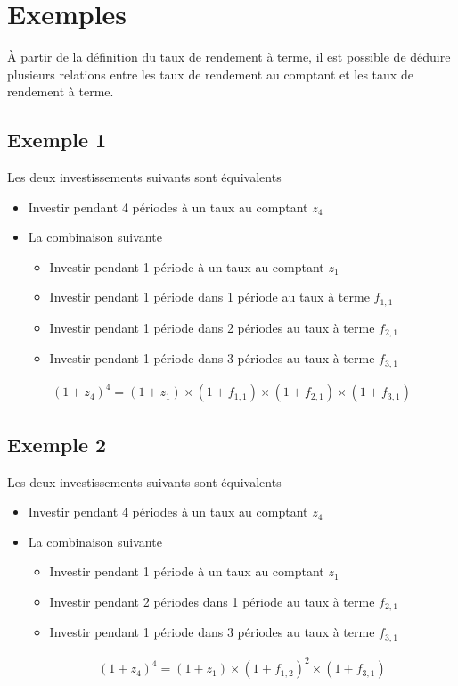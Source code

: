 \documentclass[12pt]{article}
\begin{document}
\section{Exemples}
À partir de la définition du taux de rendement à terme,  il est possible de déduire plusieurs relations entre les taux de rendement au comptant et les taux de rendement à terme.

\subsection{Exemple 1}
Les deux investissements suivants sont équivalents
\begin{itemize}
\item Investir pendant 4 périodes à un taux au comptant $z_4$
\item La combinaison suivante
\begin{itemize}
\item Investir pendant 1 période à un taux au comptant $z_1$
\item Investir pendant 1 période dans 1 période au taux à terme $f_{1,1}$
\item Investir pendant 1 période dans 2 périodes au taux à terme $f_{2,1}$
\item Investir pendant 1 période dans 3 périodes au taux à terme $f_{3,1}$
\end{itemize}
\end{itemize}
\begin{align*}
(1+z_4)^4=(1+z_1) \times (1+f_{1,1}) \times (1+f_{2,1}) \times (1+f_{3,1})
\end{align*}


\subsection{Exemple 2}
Les deux investissements suivants sont équivalents
\begin{itemize}
\item Investir pendant 4 périodes à un taux au comptant $z_4$
\item La combinaison suivante
\begin{itemize}
\item Investir pendant 1 période à un taux au comptant $z_1$
\item Investir pendant 2 périodes dans 1 période au taux à terme $f_{2,1}$
\item Investir pendant 1 période dans 3 périodes au taux à terme $f_{3,1}$
\end{itemize}

\begin{align*}
(1+z_4)^4=(1+z_1) \times (1+f_{1,2})^2 \times (1+f_{3,1})
\end{align*}
\end{itemize}
\end{document}
